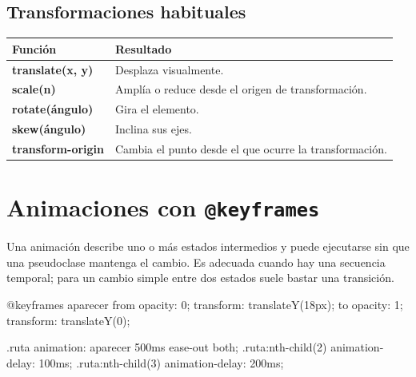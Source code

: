 \documentclass[11pt]{article}
\begin{document}
\subsection{Transformaciones habituales}

\begin{tabularx}{\linewidth}{>{\ttfamily\bfseries\small}p{4.4cm}X}
\toprule
Función & Resultado \\
\midrule
translate(x, y) & Desplaza visualmente. \\
scale(n) & Amplía o reduce desde el origen de transformación. \\
rotate(ángulo) & Gira el elemento. \\
skew(ángulo) & Inclina sus ejes. \\
transform-origin & Cambia el punto desde el que ocurre la transformación. \\
\bottomrule
\end{tabularx}


\section{Animaciones con \texttt{@keyframes}}

Una animación describe uno o más estados intermedios y puede ejecutarse sin que
una pseudoclase mantenga el cambio. Es adecuada cuando hay una secuencia temporal;
para un cambio simple entre dos estados suele bastar una transición.

\begin{csscodedark}
@keyframes aparecer {
    from {
        opacity: 0;
        transform: translateY(18px);
    }
    to {
        opacity: 1;
        transform: translateY(0);
    }
}

.ruta {
    animation: aparecer 500ms ease-out both;
}
.ruta:nth-child(2) { animation-delay: 100ms; }
.ruta:nth-child(3) { animation-delay: 200ms; }
\end{csscodedark}

\begin{center}
\end{center}
\end{document}
